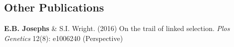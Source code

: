 \documentclass[letterpaper]{article}
\begin{document}
\subsection*{Other Publications}
\begin{etaremune}
 \item \textbf{E.B. Josephs} \& S.I. Wright. (2016) On the trail of linked selection. \textit{Plos Genetics} 12(8): e1006240 (Perspective)
 \end{etaremune}


\end{document}
